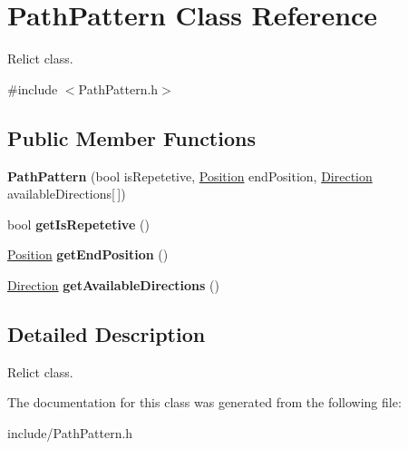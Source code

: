 \hypertarget{classPathPattern}{}\section{Path\+Pattern Class Reference}
\label{classPathPattern}


Relict class.  




{\ttfamily \#include $<$Path\+Pattern.\+h$>$}

\subsection*{Public Member Functions}
\begin{DoxyCompactItemize}
\item 
\mbox{\label{classPathPattern_aedf0fca346f2d4e00da5f6b4583239a8}} 
{\bfseries Path\+Pattern} (bool is\+Repetetive, \hyperlink{classPosition}{Position} end\+Position, \hyperlink{Enums_8h_a224b9163917ac32fc95a60d8c1eec3aa}{Direction} available\+Directions\mbox{[}$\,$\mbox{]})
\item 
\mbox{\label{classPathPattern_a4bc143c302c4a1145c219deef2c703c1}} 
bool {\bfseries get\+Is\+Repetetive} ()
\item 
\mbox{\label{classPathPattern_ae2a5b89bdc4d39c2a46bddcf9ea2c88b}} 
\hyperlink{classPosition}{Position} {\bfseries get\+End\+Position} ()
\item 
\mbox{\label{classPathPattern_abd89be9f28845abaab3d45d0a89351c1}} 
\hyperlink{Enums_8h_a224b9163917ac32fc95a60d8c1eec3aa}{Direction} {\bfseries get\+Available\+Directions} ()
\end{DoxyCompactItemize}


\subsection{Detailed Description}
Relict class. 

The documentation for this class was generated from the following file\+:\begin{DoxyCompactItemize}
\item 
include/Path\+Pattern.\+h\end{DoxyCompactItemize}
